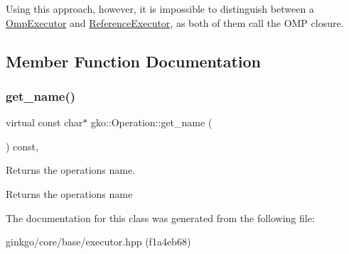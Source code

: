 Using this approach, however, it is impossible to distinguish between a \hyperlink{classgko_1_1OmpExecutor}{Omp\+Executor} and \hyperlink{classgko_1_1ReferenceExecutor}{Reference\+Executor}, as both of them call the O\+MP closure. 

\subsection{Member Function Documentation}
\mbox{\label{classgko_1_1Operation_ab3b940849d1daf02830f3387c52888d0}} 
\subsubsection{\texorpdfstring{get\+\_\+name()}{get\_name()}}
{\footnotesize\ttfamily virtual const char$\ast$ gko\+::\+Operation\+::get\+\_\+name (\begin{DoxyParamCaption}{ }\end{DoxyParamCaption}) const\hspace{0.3cm}{\ttfamily [virtual]}, {\ttfamily [noexcept]}}



Returns the operation\textquotesingle{}s name. 

\begin{DoxyReturn}{Returns}
the operation\textquotesingle{}s name 
\end{DoxyReturn}


The documentation for this class was generated from the following file\+:\begin{DoxyCompactItemize}
\item 
ginkgo/core/base/executor.\+hpp (f1a4eb68)\end{DoxyCompactItemize}
